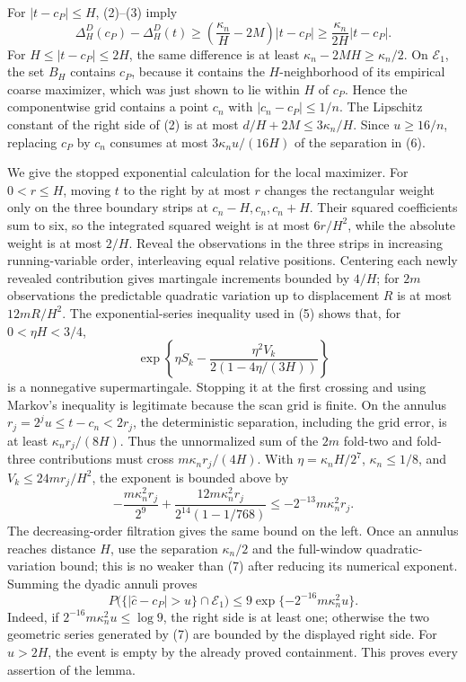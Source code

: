 For \(|t-c_P|\le H\), (2)--(3) imply
\[
 \Delta_H^D(c_P)-\Delta_H^D(t)
 \ge\left(\frac{\kappa_n}{H}-2M\right)|t-c_P|
 \ge\frac{\kappa_n}{2H}|t-c_P|. \tag{6}
\]
For \(H\le|t-c_P|\le2H\), the same difference is at least
\(\kappa_n-2MH\ge\kappa_n/2\).  On \(\mathcal E_1\), the set
\(B_H\) contains \(c_P\), because it contains the \(H\)-neighborhood
of its empirical coarse maximizer, which was just shown to lie within
\(H\) of \(c_P\).  Hence the componentwise grid contains a point
\(c_n\) with \(|c_n-c_P|\le1/n\).  The Lipschitz constant of the
right side of (2) is at most
\(d/H+2M\le3\kappa_n/H\).  Since \(u\ge16/n\), replacing \(c_P\)
by \(c_n\) consumes at most \(3\kappa_nu/(16H)\) of the separation
in (6).

We give the stopped exponential calculation for the local maximizer.
For \(0<r\le H\), moving \(t\) to the right by at most \(r\) changes
the rectangular weight only on the three boundary strips at
\(c_n-H,c_n,c_n+H\).  Their squared coefficients sum to six, so the
integrated squared weight is at most \(6r/H^2\), while the absolute
weight is at most \(2/H\).  Reveal the observations in the three
strips in increasing running-variable order, interleaving equal
relative positions.  Centering each newly revealed contribution gives
martingale increments bounded by \(4/H\); for \(2m\) observations the
predictable quadratic variation up to displacement \(R\) is at most
\(12mR/H^2\).  The exponential-series inequality used in (5) shows
that, for \(0<\eta H<3/4\),
\[
 \exp\left\{\eta S_k-
 \frac{\eta^2V_k}{2(1-4\eta/(3H))}\right\}
\]
is a nonnegative supermartingale.  Stopping it at the first crossing
and using Markov's inequality is legitimate because the scan grid is
finite.  On the annulus \(r_j=2^ju\le t-c_n<2r_j\), the deterministic
separation, including the grid error, is at least
\(\kappa_nr_j/(8H)\).  Thus the unnormalized sum of the \(2m\)
fold-two and fold-three contributions must cross
\(m\kappa_nr_j/(4H)\).  With \(\eta=\kappa_nH/2^7\),
\(\kappa_n\le1/8\), and \(V_k\le24mr_j/H^2\), the exponent is bounded
above by
\[
 -\frac{m\kappa_n^2r_j}{2^9}
 +\frac{12m\kappa_n^2r_j}
 {2^{14}(1-1/768)}
 \le-2^{-13}m\kappa_n^2r_j. \tag{7}
\]
The decreasing-order filtration gives the same bound on the left.
Once an annulus reaches distance \(H\), use the separation
\(\kappa_n/2\) and the full-window quadratic-variation bound; this is
no weaker than (7) after reducing its numerical exponent.  Summing the
dyadic annuli proves
\[
 P\bigl(\{|\widehat c-c_P|>u\}\cap\mathcal E_1\bigr)
 \le9\exp\{-2^{-16}m\kappa_n^2u\}.
\]
Indeed, if \(2^{-16}m\kappa_n^2u\le\log9\), the right side is at least
one; otherwise the two geometric series generated by (7) are bounded
by the displayed right side.  For \(u>2H\), the event is empty by the
already proved containment.  This proves every assertion of the lemma.

